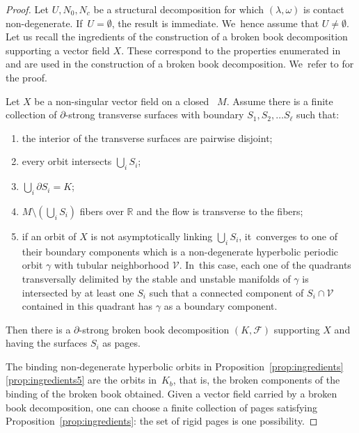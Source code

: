 \begin{proof}
Let $U, N_0, N_c$ be a structural decomposition for which $(\lambda,\omega)$ is contact non-degenerate. If~$U=\emptyset$, the result is immediate. We~hence assume that $U\neq \emptyset$. Let us recall the ingredients of the construction of a broken book decomposition supporting a vector field $X$. These correspond to the properties enumerated in \cite[Lem.\,3.6]{CDR} and are used in the construction of a broken book decomposition. We~refer to \cite[\S 3]{CDR} for the proof.

\begin{prop}\label{prop:ingredients}
Let $X$ be a non-singular vector field on a closed \threemanifold~$M$. Assume there is a finite collection of $\partial$-strong transverse surfaces with boundary $S_1, S_2, \ldots S_\ell$ such that:
\begin{enumerate}
\item\label{prop:ingredients1} the {interior of the} transverse surfaces {are pairwise disjoint};
\item\label{prop:ingredients2} every orbit intersects $\bigcup_i S_i$;
\item\label{prop:ingredients3} $\bigcup_i\partial S_i= K$;
\item\label{prop:ingredients4} $M\setminus \left(\bigcup_i S_i\right)$ fibers over $\mathbb{R}$ and the flow is transverse to the fibers;
\item\label{prop:ingredients5} if an orbit of $X$ is not asymptotically linking $\bigcup_i S_i$, it~converges to one of their boundary components which is a non-degenerate hyperbolic periodic orbit $\gamma$ with tubular neighborhood $\mathcal{V}$. In~this case, each one of the quadrants transversally delimited by the stable and unstable manifolds of $\gamma$ is intersected by at least one $S_i$ such that a connected component of $S_i\cap \mathcal{V}$ contained in this quadrant has $\gamma$ as a boundary component.
\end{enumerate}
Then there is a $\partial$-strong broken book decomposition $(K,\mathcal{F})$ supporting $X$ and having the surfaces $S_i$ as pages.
\end{prop}

The binding non-degenerate hyperbolic orbits in Proposition~\ref{prop:ingredients}\,\eqref{prop:ingredients5} are the orbits in~$K_b$, that is, the broken components of the binding of the broken book obtained. Given a vector field carried by a broken book decomposition, one can choose a finite collection of pages satisfying Proposition~\ref{prop:ingredients}: the set of rigid pages is one possibility.


\end{proof}
